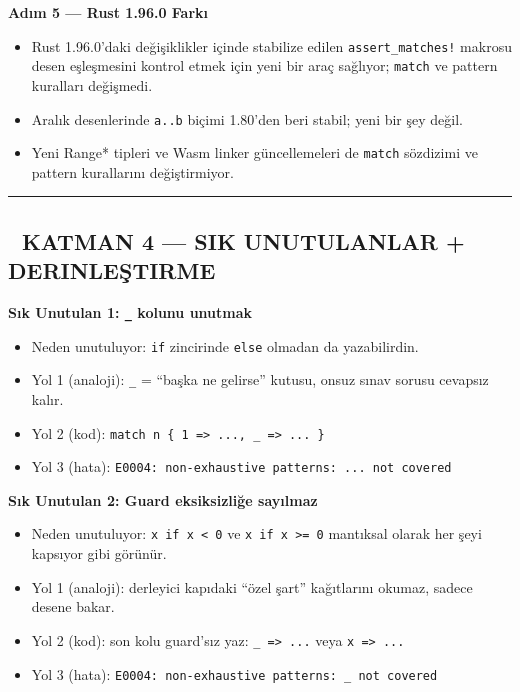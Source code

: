 \documentclass[12pt,a4paper]{article}
\begin{document}
\textbf{Adım 5 --- Rust 1.96.0 Farkı}

\begin{itemize}
\tightlist
\item
  Rust 1.96.0'daki değişiklikler içinde stabilize edilen \texttt{assert\_matches!} makrosu desen eşleşmesini kontrol etmek için yeni bir araç sağlıyor; \texttt{match} ve pattern kuralları değişmedi.
\item
  Aralık desenlerinde \texttt{a..b} biçimi 1.80'den beri stabil; yeni bir şey değil.
\item
  Yeni Range* tipleri ve Wasm linker güncellemeleri de \texttt{match} sözdizimi ve pattern kurallarını değiştirmiyor.
\end{itemize}

\begin{center}\rule{0.5\linewidth}{0.5pt}\end{center}

\subsection{🔴 KATMAN 4 --- SIK UNUTULANLAR + DERINLEŞTIRME}\label{katman-4-—-sik-unutulanlar-derinleştirme-7}

\textbf{Sık Unutulan 1: \texttt{\_} kolunu unutmak}

\begin{itemize}
\tightlist
\item
  Neden unutuluyor: \texttt{if} zincirinde \texttt{else} olmadan da yazabilirdin.
\item
  Yol 1 (analoji): \texttt{\_} = ``başka ne gelirse'' kutusu, onsuz sınav sorusu cevapsız kalır.
\item
  Yol 2 (kod): \texttt{match\ n\ \{\ 1\ =\textgreater{}\ ...,\ \_\ =\textgreater{}\ ...\ \}}
\item
  Yol 3 (hata): \texttt{E0004:\ non-exhaustive\ patterns:\ ...\ not\ covered}
\end{itemize}

\textbf{Sık Unutulan 2: Guard eksiksizliğe sayılmaz}

\begin{itemize}
\tightlist
\item
  Neden unutuluyor: \texttt{x\ if\ x\ \textless{}\ 0} ve \texttt{x\ if\ x\ \textgreater{}=\ 0} mantıksal olarak her şeyi kapsıyor gibi görünür.
\item
  Yol 1 (analoji): derleyici kapıdaki ``özel şart'' kağıtlarını okumaz, sadece desene bakar.
\item
  Yol 2 (kod): son kolu guard'sız yaz: \texttt{\_\ =\textgreater{}\ ...} veya \texttt{x\ =\textgreater{}\ ...}
\item
  Yol 3 (hata): \texttt{E0004:\ non-exhaustive\ patterns:\ \_\ not\ covered}
\end{itemize}
\end{document}
